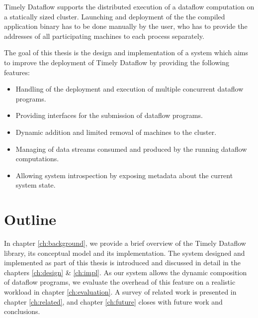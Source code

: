 Timely Dataflow supports the distributed execution of a dataflow computation
on a statically sized cluster. Launching and deployment of the the compiled
application binary has to be done manually by the user, who has to provide the
addresses of all participating machines to each process separately.

The goal of this thesis is the design and implementation of a system which
aims to improve the deployment of Timely Dataflow by providing the following
features:

\begin{itemize}
\item Handling of the deployment and execution of multiple concurrent dataflow programs.
\item Providing interfaces for the submission of dataflow programs.
\item Dynamic addition and limited removal of machines to the cluster.
\item Managing of data streams consumed and produced by the running dataflow computations.
\item Allowing system introspection by exposing metadata about the current system state.
\end{itemize}



\section{Outline}

In chapter \ref{ch:background}, we provide a brief overview of
the Timely Dataflow library, its conceptual model and its implementation. The
system designed and implemented as part of this thesis is introduced and
discussed in detail in the chapters \ref{ch:design} \& \ref{ch:impl}. As our
system allows the dynamic composition of dataflow programs, we evaluate the
overhead of this feature on a realistic workload in chapter \ref{ch:evaluation}.
A survey of related work is presented in chapter \ref{ch:related}, and chapter
\ref{ch:future} closes with future work and conclusions.
